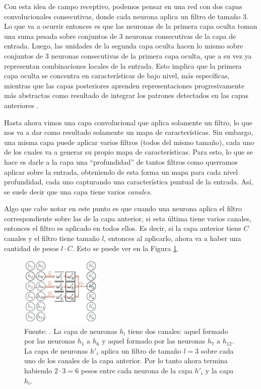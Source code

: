 \documentclass[../../main.tex]{subfiles}
\begin{document}
Con esta idea de campo receptivo, podemos pensar en una red con dos capas convolucionales
consecutivas, donde cada neurona aplica un filtro de tamaño 3. Lo que va a ocurrir
entonces es que las neuronas de la primera capa oculta toman una suma pesada sobre
conjuntos de 3 neuronas consecutivas de la capa de entrada. Luego, las unidades de la
segunda capa oculta hacen lo mismo sobre conjuntos de 3 neuronas consecutivas de la
primera capa oculta, que a su vez ya representan combinaciones locales de la entrada. Esto
implica que la primera capa oculta se concentra en características de bajo nivel, más
específicas, mientras que las capas posteriores aprenden representaciones progresivamente
más abstractas como resultado de integrar los patrones detectados en las capas anteriores
\cite{hands-on-ML-sklearn-tf}.

Hasta ahora vimos una capa convolucional que aplica solamente un filtro, lo que nos va a
dar como resultado solamente un mapa de características. Sin embargo, una misma capa puede
aplicar varios filtros (todos del mismo tamaño), cada uno de los cuales va a generar su
propio mapa de características. Para esto, lo que se hace es darle a la capa una
``profundidad'' de tantos filtros como querramos aplicar sobre la entrada, obteniendo de
esta forma un mapa para cada nivel profundidad, cada uno capturando una característica
puntual de la entrada. Así, se suele decir que una capa tiene varios \textit{canales}.

Algo que cabe notar en este punto es que cuando una neurona aplica el filtro
correspondiente sobre las de la capa anterior, si esta última tiene varios canales,
entonces el filtro es aplicado en todos ellos. Es decir, si la capa anterior tiene \(C\)
canales y el filtro tiene tamaño \(l\), entonces al aplicarlo, ahora va a haber una
cantidad de pesos \(l \cdot C\). Esto se puede ver en la Figura
\ref{fig:conv-layer-multi-channel}.

\begin{figure}
    \centering
    \includegraphics[width=0.35\textwidth]{figs/conv-layer-multi-channel.png}
    \caption{Fuente: \cite{prince2024understanding}. La capa de neuronas \(h_i\) tiene
    dos canales: aquel formado por las neuronas \(h_1\) a \(h_6\) y aquel formado
    por las neuronas \(h_7\) a \(h_{12}\). La capa de neuronas \(h'_i\) aplica un
    filtro de tamaño \(l=3\) sobre cada uno de los canales de la capa anterior. Por
    lo tanto ahora termina habiendo \(2 \cdot 3 = 6\) pesos entre cada neurona de la
    capa \(h'_i\) y la capa \(h_i\).}
    \label{fig:conv-layer-multi-channel}
\end{figure}
\end{document}
